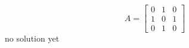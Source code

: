 {
\[A=
\begin{bmatrix}
	0 & 1 & 0 \\
	1 & 0 & 1 \\
	0 & 1 & 0
\end{bmatrix}
\]
}
{
no solution yet
}
